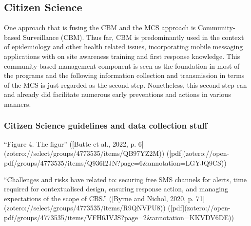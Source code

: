 \subsection{Citizen Science}

One approach that is fusing the CBM and the MCS approach is Community-based Surveillance (CBM). Thus far, CBM is predominantly used in the context of epidemiology and other health related issues, incorporating mobile messaging applications with on site awareness training and first response knowledge. This community-based management component is seen as the foundation in most of the programs and the following information collection and transmission in terms of the MCS is just regarded as the second step. Nonetheless, this second step can and already did facilitate numerous early preventions and actions in various manners.

\subsubsection{Citizen Science guidelines and data collection stuff} %
“Figure 4. The figur” ([Butte et al., 2022, p. 6](zotero://select/groups/4773535/items/QB97YZ2M)) ([pdf](zotero://open-pdf/groups/4773535/items/Q936I2JN?page=6&annotation=LGYJQ9CS))



“Challenges and risks have related to: securing free SMS channels for alerts, time required for contextualised design, ensuring response action, and managing expectations of the scope of CBS.” ([Byrne and Nichol, 2020, p. 71](zotero://select/groups/4773535/items/R9QNVPU8)) ([pdf](zotero://open-pdf/groups/4773535/items/VFH6JVJS?page=2&annotation=KKVDV6DE))

